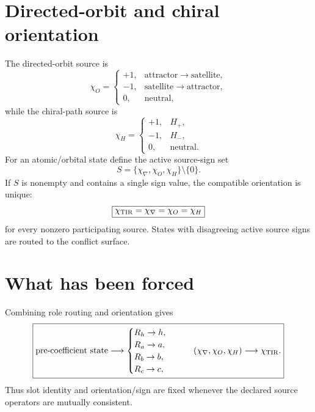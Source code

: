 
\section{Directed-orbit and chiral orientation}
The directed-orbit source is
\begin{equation}
\chi_O=
\begin{cases}
+1,&\text{attractor}\to\text{satellite},\\
-1,&\text{satellite}\to\text{attractor},\\
0,&\text{neutral},
\end{cases}
\label{eq:v12-orbit-orientation}
\end{equation}
while the chiral-path source is
\begin{equation}
\chi_H=
\begin{cases}
+1,&H_+,\\
-1,&H_-,\\
0,&\text{neutral}.
\end{cases}
\label{eq:v12-chiral-orientation}
\end{equation}
For an atomic/orbital state define the active source-sign set
\[
S=\{\chi_\nabla,\chi_O,\chi_H\}\setminus\{0\}.
\]
If $S$ is nonempty and contains a single sign value, the compatible orientation
is unique:
\begin{equation}
\boxed{
\chi_{\rm TIR}=\chi_\nabla=\chi_O=\chi_H
}
\label{eq:v12-consensus-orientation}
\end{equation}
for every nonzero participating source. States with disagreeing active source
signs are routed to the conflict surface.


\section{What has been forced}
Combining role routing and orientation gives
\begin{equation}
\boxed{
\text{pre-coefficient state}
\longrightarrow
\begin{cases}
R_h\to h,\\
R_a\to a,\\
R_b\to b,\\
R_c\to c,
\end{cases}
\qquad
(\chi_\nabla,\chi_O,\chi_H)
\longrightarrow\chi_{\rm TIR}.
}
\label{eq:v12-coefficient-forcing-chain}
\end{equation}
Thus slot identity and orientation/sign are fixed whenever the declared source
operators are mutually consistent.

